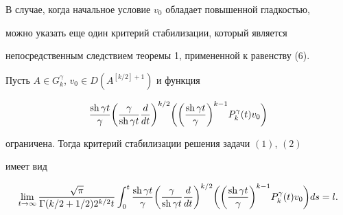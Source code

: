 В случае, когда начальное условие $v_0$ обладает повышенной гладкостью,


можно указать еще один критерий стабилизации, который является


непосредственным следствием теоремы 1, примененной к равенству (6).





\begin{thm}


Пусть $A\in G_k^\gamma$, $v_0\in D(A^{[k/2]+1})$ и функция


$$


\frac{\sh \gamma t}{\gamma}


\bigg(\frac{\gamma}{\sh \gamma t} \frac{d}{dt}\bigg )^{k/2}


\bigg(\bigg(\frac{\sh \gamma t}{\gamma}\bigg )^{k-1}


P_k^\gamma(t)v_0\bigg )


$$


ограничена. Тогда критерий стабилизации решения задачи $(1)$, $(2)$


имеет вид


$$


\lim_{t\to\infty}


\frac{\sqrt{\pi}}{\Gamma(k/2+1/2)2^{k/2}t}


\int_0^t \frac{\sh \gamma t}{\gamma}


\bigg(\frac{\gamma}{\sh \gamma t} \frac{d}{dt}\bigg )^{k/2}


\bigg(\bigg(\frac{\sh \gamma t}{\gamma}\bigg )^{k-1}


P_k^\gamma(t)v_0\bigg ) ds =l.


$$


\end{thm}






